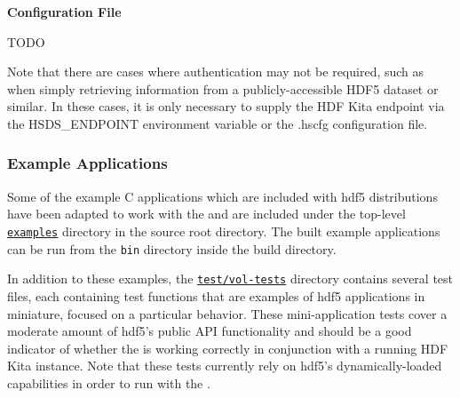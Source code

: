 \documentclass[../users_guide.tex]{subfiles}
\begin{document}
\textbf{Configuration File}

TODO

Note that there are cases where authentication may not be required, such as when simply
retrieving information from a publicly-accessible HDF5 dataset or similar. In these cases, it
is only necessary to supply the HDF Kita endpoint via the HSDS\_ENDPOINT environment variable
or the .hscfg configuration file.

\subsubsection{Example Applications}

Some of the example C applications which are included with \acrshort{hdf5} distributions have
been adapted to work with the \rvc{} and are included under the top-level
\href{https://bitbucket.hdfgroup.org/projects/HDF5VOL/repos/rest/browse/examples}{\texttt{examples}}
directory in the \rvc{} source root directory. The built example applications can be run from the
\texttt{bin} directory inside the build directory.

In addition to these examples, the \href{https://bitbucket.hdfgroup.org/projects/HDF5VOL/repos/rest/browse/test}{\texttt{test/vol-tests}}
directory contains several test files, each containing test functions that are examples of \acrshort{hdf5}
applications in miniature, focused on a particular behavior. These mini-application tests cover a moderate
amount of \acrshort{hdf5}'s public API functionality and should be a good indicator of whether the \rvc{}
is working correctly in conjunction with a running HDF Kita instance. Note that these tests currently rely
on \acrshort{hdf5}'s dynamically-loaded \vc{} capabilities in order to run with the \rvc{}.
\end{document}
